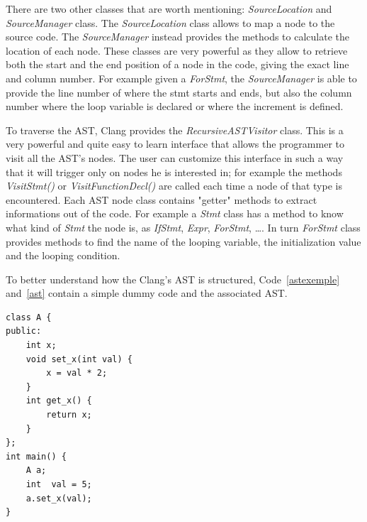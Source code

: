 \documentclass[a4paper,11pt,oneside]{book}
\begin{document}
There are two other classes that are worth mentioning: \emph{SourceLocation} and \emph{SourceManager} class. The \emph{SourceLocation} class allows to map a node to the source code. The \emph{SourceManager} instead provides the methods to calculate the location of each node. These classes are very powerful as they allow to retrieve both the start and the end position of a node in the code, giving the exact line and column number. For example given a \emph{ForStmt}, the \emph{SourceManager} is able to provide the line number of where the stmt starts and ends, but also the column number where the loop variable is declared or where the increment is defined.

To traverse the AST, Clang provides the \emph{RecursiveASTVisitor} class. This is a very powerful and quite easy to learn interface that allows the programmer to visit all the AST’s nodes. The user can customize this interface in such a way that it will trigger only on nodes he is interested in; for example the methods \emph{VisitStmt()} or \emph{VisitFunctionDecl()} are called each time a node of that type is encountered. Each AST node class contains "getter" methods to extract informations out of the code. For example a \emph{Stmt} class has a method to know what kind of \emph{Stmt} the node is, as \emph{IfStmt}, \emph{Expr}, \emph{ForStmt}, \dots. In turn \emph{ForStmt} class provides methods to find the name of the looping variable, the initialization value and the looping condition.

To better understand how the Clang’s AST is structured, Code~\ref{astexemple} and~\ref{ast} contain a simple dummy code and the associated AST.
\newline
\begin{lstlisting}[language=CCC, caption=Simple code., label=astexemple]
class A {
public:
	int x;
	void set_x(int val) {
		x = val * 2;
	}	
	int get_x() {
		return x;
	}
};
int main() {
	A a;
	int  val = 5;
	a.set_x(val);
}
\end{lstlisting}
\end{document}
